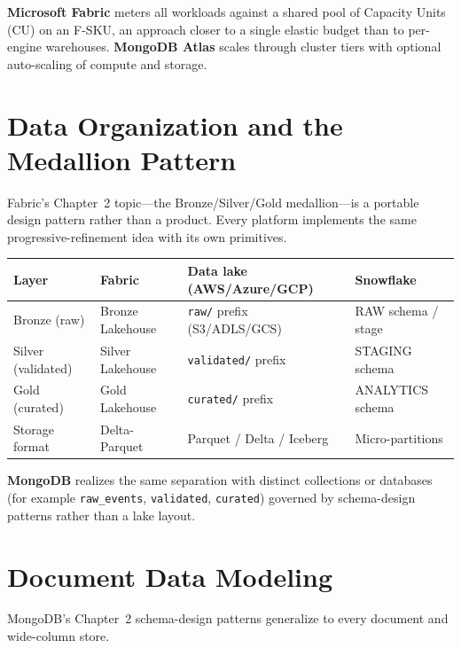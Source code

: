 \noindent \textbf{Microsoft Fabric} meters all workloads against a shared pool of Capacity Units
(CU) on an F-SKU, an approach closer to a single elastic budget than to per-engine warehouses.
\textbf{MongoDB Atlas} scales through cluster tiers with optional auto-scaling of compute and storage.

\section{Data Organization and the Medallion Pattern}
%
Fabric's Chapter~2 topic---the Bronze/Silver/Gold medallion---is a portable design pattern rather
than a product. Every platform implements the same progressive-refinement idea with its own primitives.

\begin{center}
\footnotesize
\begin{tabular}{@{}p{2.6cm}p{3.4cm}p{3.4cm}p{3.0cm}@{}}
\toprule
\textbf{Layer} & \textbf{Fabric} & \textbf{Data lake (AWS/Azure/GCP)} & \textbf{Snowflake} \\
\midrule
Bronze (raw) & Bronze Lakehouse & \texttt{raw/} prefix (S3/ADLS/GCS) & RAW schema / stage \\
Silver (validated) & Silver Lakehouse & \texttt{validated/} prefix & STAGING schema \\
Gold (curated) & Gold Lakehouse & \texttt{curated/} prefix & ANALYTICS schema \\
Storage format & Delta-Parquet & Parquet / Delta / Iceberg & Micro-partitions \\
\bottomrule
\end{tabular}
\end{center}

\noindent \textbf{MongoDB} realizes the same separation with distinct collections or databases
(for example \texttt{raw\_events}, \texttt{validated}, \texttt{curated}) governed by schema-design
patterns rather than a lake layout.

\section{Document Data Modeling}
%
MongoDB's Chapter~2 schema-design patterns generalize to every document and wide-column store.

